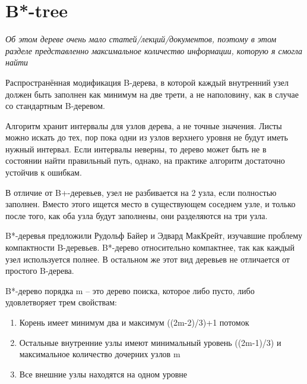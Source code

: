 \section{B*-tree}
    \textit{Об этом дереве очень мало статей/лекций/документов, поэтому в этом разделе представленно максимальное количество информации, которую я смогла найти} \par
    Распространённая модификация B-дерева, в которой каждый внутренний узел должен быть заполнен как минимум на две трети, а не наполовину, как в случае со стандартным B-деревом. \par
    Алгоритм хранит интервалы для узлов дерева, а не точные значения. Листы можно искать до тех, пор пока одни из узлов верхнего уровня не будут иметь нужный интервал. Если интервалы неверны, то дерево может быть не в состоянии найти правильный путь, однако, на практике алгоритм достаточно устойчив к ошибкам.\par
    В отличие от B+-деревьев, узел не разбивается на 2 узла, если полностью заполнен. Вместо этого ищется место в существующем соседнем узле, и только после того, как оба узла будут заполнены, они разделяются на три узла. \par
    B*-деревья предложили Рудольф Байер и Эдвард МакКрейт, изучавшие проблему компактности B-деревьев. B*-дерево относительно компактнее, так как каждый узел используется полнее. В остальном же этот вид деревьев не отличается от простого B-дерева.
    \par
    B*-дерево порядка m – это дерево поиска, которое либо пусто, либо удовлетворяет трем свойствам:
    \par
    \begin{enumerate}
        \item Корень имеет минимум два и максимум ((2m-2)/3)+1 потомок 
        \item Остальные внутренние узлы имеют минимальный уровень ((2m-1)/3) и максимальное количество дочерних узлов m 
        \item Все внешние узлы находятся на одном уровне
    \end{enumerate}
    \newpage
